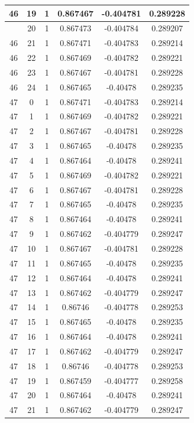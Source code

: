 \documentclass[12pt,a4paper]{article}
\numberwithin{equation}{section}
\numberwithin{figure}{section}
\numberwithin{table}{section}
\begin{document}
\begin{longtable}{|c|c|c|c|c|c|}
46 & 19 & 1 & 0.867467 & -0.404781 & 0.289228 \\ \hline
\pagebreak
46 & 20 & 1 & 0.867473 & -0.404784 & 0.289207 \\ \hline
46 & 21 & 1 & 0.867471 & -0.404783 & 0.289214 \\ \hline
46 & 22 & 1 & 0.867469 & -0.404782 & 0.289221 \\ \hline
46 & 23 & 1 & 0.867467 & -0.404781 & 0.289228 \\ \hline
46 & 24 & 1 & 0.867465 & -0.40478 & 0.289235 \\ \hline
47 & 0 & 1 & 0.867471 & -0.404783 & 0.289214 \\ \hline
47 & 1 & 1 & 0.867469 & -0.404782 & 0.289221 \\ \hline
47 & 2 & 1 & 0.867467 & -0.404781 & 0.289228 \\ \hline
47 & 3 & 1 & 0.867465 & -0.40478 & 0.289235 \\ \hline
47 & 4 & 1 & 0.867464 & -0.40478 & 0.289241 \\ \hline
47 & 5 & 1 & 0.867469 & -0.404782 & 0.289221 \\ \hline
47 & 6 & 1 & 0.867467 & -0.404781 & 0.289228 \\ \hline
47 & 7 & 1 & 0.867465 & -0.40478 & 0.289235 \\ \hline
47 & 8 & 1 & 0.867464 & -0.40478 & 0.289241 \\ \hline
47 & 9 & 1 & 0.867462 & -0.404779 & 0.289247 \\ \hline
47 & 10 & 1 & 0.867467 & -0.404781 & 0.289228 \\ \hline
47 & 11 & 1 & 0.867465 & -0.40478 & 0.289235 \\ \hline
47 & 12 & 1 & 0.867464 & -0.40478 & 0.289241 \\ \hline
47 & 13 & 1 & 0.867462 & -0.404779 & 0.289247 \\ \hline
47 & 14 & 1 & 0.86746 & -0.404778 & 0.289253 \\ \hline
47 & 15 & 1 & 0.867465 & -0.40478 & 0.289235 \\ \hline
47 & 16 & 1 & 0.867464 & -0.40478 & 0.289241 \\ \hline
47 & 17 & 1 & 0.867462 & -0.404779 & 0.289247 \\ \hline
47 & 18 & 1 & 0.86746 & -0.404778 & 0.289253 \\ \hline
47 & 19 & 1 & 0.867459 & -0.404777 & 0.289258 \\ \hline
47 & 20 & 1 & 0.867464 & -0.40478 & 0.289241 \\ \hline
47 & 21 & 1 & 0.867462 & -0.404779 & 0.289247 \\ \hline

\end{longtable}
\end{document}
